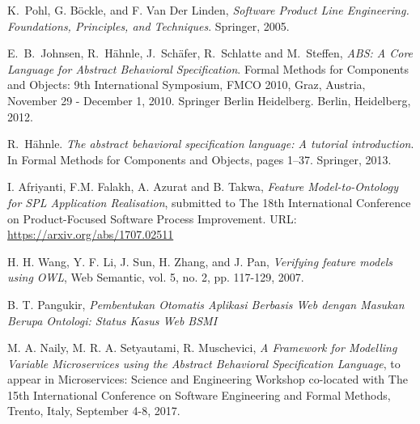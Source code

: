 \documentclass[conference]{IEEEtran}
\begin{document}

%
%
%
\begin{thebibliography}{1}


K.~Pohl, G. B\"{o}ckle, and F. Van Der Linden, \textit{Software Product Line Engineering. Foundations, Principles, and Techniques}. Springer, 2005.

E.~B.~Johnsen, R.~H\"{a}hnle, J.~Sch\"{a}fer, R.~Schlatte and M.~Steffen, \textit{ABS: A Core Language for Abstract Behavioral Specification}. Formal Methods for Components and Objects: 9th International Symposium, FMCO 2010, Graz, Austria, November 29 - December 1, 2010. Springer Berlin Heidelberg. Berlin, Heidelberg, 2012. 

R.~H\"{a}hnle. \textit{The abstract behavioral specification language: A tutorial introduction}.
In Formal Methods for Components and Objects, pages 1–37. Springer, 2013.

I. Afriyanti, F.M. Falakh, A. Azurat and B. Takwa, \textit{Feature Model-to-Ontology for SPL Application Realisation}, submitted to The 18th International Conference on Product-Focused Software Process Improvement. URL: \url{https://arxiv.org/abs/1707.02511}

H. H. Wang, Y. F. Li, J. Sun, H. Zhang, and J. Pan, \textit{Verifying feature models using OWL}, Web Semantic, vol. 5, no. 2, pp. 117-129, 2007.


B. T. Pangukir, \textit{Pembentukan Otomatis Aplikasi Berbasis Web dengan Masukan Berupa Ontologi: Status Kasus Web BSMI}

M. A. Naily, M. R. A. Setyautami, R. Muschevici, \textit{A Framework for Modelling Variable Microservices using the Abstract Behavioral Specification Language}, to appear in Microservices: Science and Engineering Workshop co-located with The 15th International Conference on Software Engineering and Formal Methods, Trento, Italy, September 4-8, 2017. 

\end{thebibliography}

\end{document}
